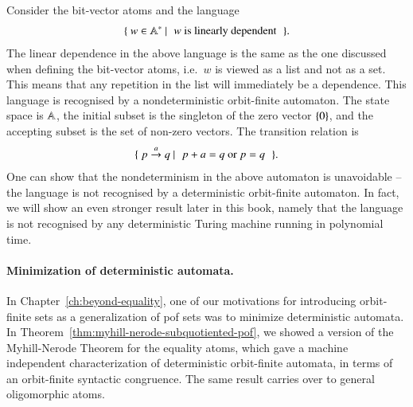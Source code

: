\begin{myexample}\label{ex:linearly-dependent-automaton}
	Consider the bit-vector atoms and the language 
	\begin{align*}
	\setbuild{ w \in \atoms^*}{$w$ is linearly dependent}.
	\end{align*}
	The linear dependence in the above language is the same as the one discussed when defining the bit-vector atoms, i.e.~$w$ is viewed as a list and not as a set. This means that any repetition in the list will immediately be a dependence. This language is recognised by a nondeterministic orbit-finite automaton. The state space is $\mathbb A$, the initial subset is the singleton of the zero vector $\{0\}$, and the accepting subset is the set of  non-zero vectors. The transition relation is 
	\begin{align*}
	\setbuild{ p \stackrel a \to q}{$p+a=q$ or $p=q$}.
	\end{align*}
	One can show that the nondeterminism in the above automaton is unavoidable -- the  language is not recognised by a deterministic orbit-finite automaton. In fact, we will show an even stronger result later in this book, namely that the language is not recognised by any deterministic Turing machine running in polynomial time.
\end{myexample}
 














\paragraph*{Minimization of deterministic automata.} In Chapter~\ref{ch:beyond-equality}, one of our motivations for introducing orbit-finite sets as a generalization of pof sets was to minimize deterministic automata. In Theorem~\ref{thm:myhill-nerode-subquotiented-pof}, we showed a version of the Myhill-Nerode Theorem for the equality atoms, which gave a machine independent characterization of deterministic orbit-finite automata, in terms of an orbit-finite syntactic congruence. The same result carries over to general oligomorphic atoms.

